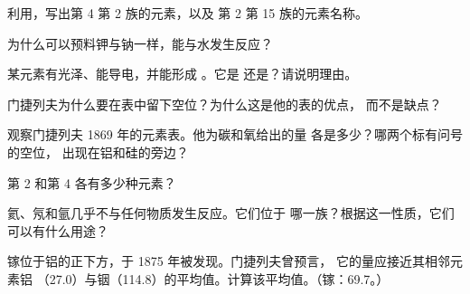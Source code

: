 \begin{exercise}[$\star\star$]\label{exo:g9:periodic-table-first-look:5}
利用，写出第 4 第 2 族的元素，以及
第 2 第 15 族的元素名称。
\end{exercise}

\begin{exercise}[$\star\star$]\label{exo:g9:periodic-table-first-look:6}
为什么可以预料钾与钠一样，能与水发生反应？
\end{exercise}

\begin{exercise}[$\star\star$]\label{exo:g9:periodic-table-first-look:7}
某元素有光泽、能导电，并能形成 。它是
还是？请说明理由。
\end{exercise}

\begin{exercise}[$\star\star$]\label{exo:g9:periodic-table-first-look:8}
门捷列夫为什么要在表中留下空位？为什么这是他的表的优点，
而不是缺点？
\end{exercise}

\begin{exercise}[$\star\star$]\label{exo:g9:periodic-table-first-look:9}
观察门捷列夫 1869 年的元素表。他为碳和氧给出的量
各是多少？哪两个标有问号的空位，
出现在铝和硅的旁边？
\end{exercise}

\begin{exercise}[$\star\star$]\label{exo:g9:periodic-table-first-look:10}
第 2 和第 4 各有多少种元素？
\end{exercise}

\begin{exercise}[$\star\star\star$]\label{exo:g9:periodic-table-first-look:11}
氦、氖和氩几乎不与任何物质发生反应。它们位于
哪一族？根据这一性质，它们可以有什么用途？
\end{exercise}

\begin{exercise}[$\star\star\star$]\label{exo:g9:periodic-table-first-look:12}
镓位于铝的正下方，于 1875 年被发现。门捷列夫曾预言，
它的量应接近其相邻元素铝
（27.0）与铟（114.8）的平均值。计算该平均值。（镓：69.7。）
\end{exercise}

